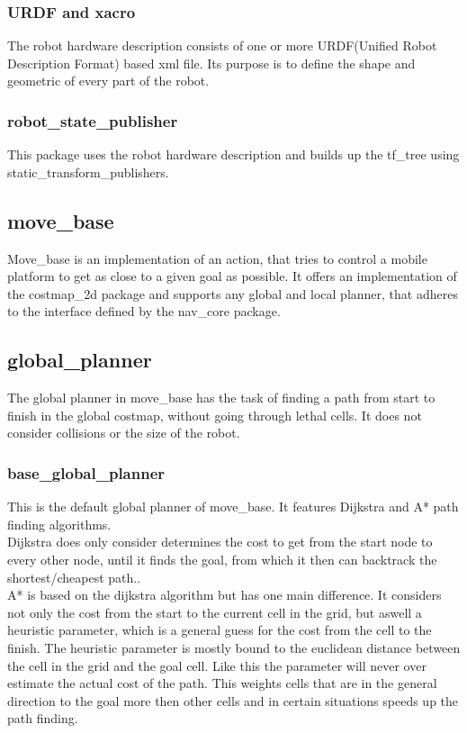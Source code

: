 \subsubsection{URDF and xacro}
The robot hardware description consists of one or more URDF(Unified Robot Description Format) based xml file. Its purpose is to define the shape and geometric of every part of the robot. 

\subsubsection{robot\_state\_publisher}
	This package uses the robot hardware description and builds up the tf\_tree using static\_transform\_publishers.


\subsection{move\_base}
Move\_base is an implementation of an action, that tries to control a mobile platform to get as close to a given goal as possible. It offers an implementation of the costmap\_2d package and supports any global and local planner, that adheres to the interface defined by the nav\_core package\cite{movebase}.

\subsection{global\_planner}
The global planner in move\_base has the task of finding a path from start to finish in the global costmap, without going through lethal cells. It does not consider collisions or the size of the robot.

\subsubsection{base\_global\_planner}
This is the default global planner of move\_base. It features Dijkstra and A* path finding algorithms.\\

Dijkstra does only consider determines the cost to get from the start node to every other node, until it finds the goal, from which it then can backtrack the shortest/cheapest path.\cite{AlgorithmenundDatenstrukturen}.\\

A* is based on the dijkstra algorithm but has one main difference. It considers not only the cost from the start to the current cell in the grid, but aswell a heuristic parameter, which is a general guess for the cost from the cell to the finish. The heuristic parameter is mostly bound to the euclidean distance between the cell in the grid and the goal cell. Like this the parameter will never over estimate the actual cost of the path\cite{AlgorithmenundDatenstrukturen}. This weights cells that are in the general direction to the goal more then other cells and in certain situations speeds up the path finding.\\

